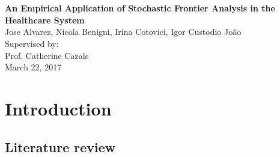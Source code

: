 \documentclass[12pt,a4paper]{article}\usepackage[]{graphicx}\usepackage[]{color}
\begin{document}



\vspace{1cm}
\begin{center}
 \\
\vspace{2cm}
 \\  %
\vspace{1cm}
\textbf{\Large{An Empirical Application of Stochastic Frontier Analysis in the Healthcare System}} \\
\vspace{1cm}
Jose Alvarez, Nicola Benigni, Irina Cotovici, Igor Custodio Jo\~{a}o \\
\vspace{1cm}
Supervised by: \\
Prof. Catherine Cazals \\
\vspace{1cm}
March 22, 2017
\end{center}

\vfill

\begin{abstract}
\noindent
The abstract goes here
\end{abstract}

\newpage 
{}
\tableofcontents

\newpage
\section{Introduction}
\subsection{Literature review}
\end{document}
